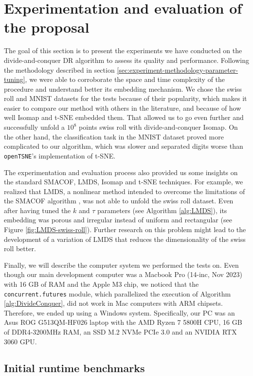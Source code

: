 \section{Experimentation and evaluation of the proposal}
\label{sec:experimentation-and-evaluation}

The goal of this section is to present the experiments we have conducted on the divide-and-conquer DR algorithm to assess its quality and performance. Following the methodology described in section \ref{sec:experiment-methodology-parameter-tuning}, we were able to corroborate the space and time complexity of the procedure and understand better its embedding mechanism. We chose the swiss roll and MNIST datasets for the tests because of their popularity, which makes it easier to compare our method with others in the literature, and because of how well Isomap and t-SNE embedded them. That allowed us to go even further and successfully unfold a $10^8$ points swiss roll with divide-and-conquer Isomap. On the other hand, the classification task in the MNIST dataset proved more complicated to our algorithm, which was slower and separated digits worse than \verb|openTSNE|'s implementation of t-SNE.

The experimentation and evaluation process also provided us some insights on the standard SMACOF, LMDS, Isomap and t-SNE techniques. For example, we realized that LMDS, a nonlinear method intended to overcome the limitations of the SMACOF algorithm \citep{Chen2009}, was not able to unfold the swiss roll dataset. Even after having tuned the $k$ and $\tau$ parameters (see Algorithm \ref{alg:LMDS}), its embedding was porous and irregular instead of uniform and rectangular (see Figure \ref{fig:LMDS-swiss-roll}). Further research on this problem might lead to the development of a variation of LMDS that reduces the dimensionality of the swiss roll better.

Finally, we will describe the computer system we performed the tests on. Even though our main development computer was a  Macbook Pro (14-inc, Nov 2023) with 16 GB of RAM and the Apple M3 chip, we noticed that the \verb|concurrent.futures| module, which parallelized the execution of Algorithm \ref{alg:DivideConquer}, did not work in Mac computers with ARM chipsets. Therefore, we ended up using a Windows system. Specifically, our PC was an Asus ROG G513QM-HF026 laptop with the AMD Ryzen 7 5800H CPU, 16 GB of DDR4-3200MHz RAM, an SSD M.2 NVMe PCIe 3.0 and an NVIDIA RTX 3060 GPU.

\subsection{Initial runtime benchmarks}
\label{sec:initial-runtime-benchmarks}

